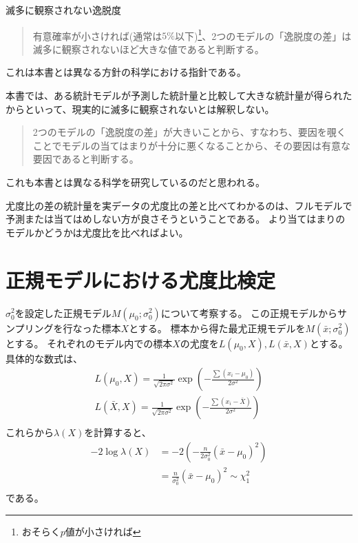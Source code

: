 \begin{SMbox}{滅多に観察されない逸脱度}
\begin{quote}
    有意確率が小さければ(通常は$5\%$以下)\footnote{おそらく$p$値が小さければ}、2つのモデルの「逸脱度の差」は滅多に観察されないほど大きな値であると判断する。
\end{quote}
    これは本書とは異なる方針の科学における指針である。

    本書では、ある統計モデルが予測した統計量と比較して大きな統計量が得られたからといって、現実的に滅多に観察されないとは解釈しない。
\begin{quote}
    2つのモデルの「逸脱度の差」が大きいことから、すなわち、要因を覗くことでモデルの当てはまりが十分に悪くなることから、その要因は有意な要因であると判断する。
\end{quote}
    これも本書とは異なる科学を研究しているのだと思われる。

    尤度比の差の統計量を実データの尤度比の差と比べてわかるのは、フルモデルで予測または当てはめしない方が良さそうということである。
    より当てはまりのモデルかどうかは尤度比を比べればよい。
\end{SMbox}

\section{正規モデルにおける尤度比検定}

$\sigma^2_0$を設定した正規モデル$M(\mu_0;\sigma^2_0)$について考察する。
この正規モデルからサンプリングを行なった標本$X$とする。
標本から得た最尤正規モデルを$M(\bar{x};\sigma^2_0)$とする。
それぞれのモデル内での標本$X$の尤度を$L(\mu_0,X),L(\bar{x},X)$とする。
具体的な数式は、
\begin{align}
    L(\mu_0,X)=\frac{1}{\sqrt{2\pi\sigma^2}}\exp(-\frac{\sum(x_i-\mu_0)}{2\sigma^2})\\
    L(\bar{X},X)=\frac{1}{\sqrt{2\pi\sigma^2}}\exp(-\frac{\sum(x_i-\bar{X})}{2\sigma^2})\\
\end{align}
これらから$\lambda(X)$を計算すると、
\begin{align}
    -2\log\lambda(X) &= -2(-\frac{n}{2\sigma^2_0}(\bar{x}-\mu_0)^2) \\
    &= \frac{n}{\sigma^2_0}(\bar{x}-\mu_0)^2 \sim \chi^2_1 \\
\end{align}
である。


